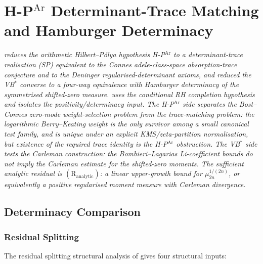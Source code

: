 \chapter{H-P\(^{\mathrm{Ar}}\) Determinant-Trace Matching and Hamburger Determinacy}
\label{v4-arith:hpar-det}

\emph{ reduces the arithmetic
Hilbert--P\'olya hypothesis H-P\(^{\mathrm{Ar}}\) to a determinant-trace
realisation (SP) equivalent to the Connes adele-class-space
absorption-trace conjecture and to the Deninger regularised-determinant
axioms, and reduced the VB\(^{*}\) converse to a four-way equivalence
with Hamburger determinacy of the symmetrised shifted-zero measure.
 uses the conditional
RH completion hypothesis and isolates the positivity/determinacy input.
The H-P\(^{\mathrm{Ar}}\) side separates
the Bost--Connes zero-mode \emph{weight-selection} problem from the
trace-matching problem: the logarithmic Berry--Keating weight is the
only survivor among a small canonical test family, and is unique under
an explicit KMS/zeta-partition normalisation, but existence of the
required trace identity is the H-P\(^{\mathrm{Ar}}\) obstruction.
The VB\(^{*}\) side tests the Carleman construction: the
Bombieri--Lagarias Li-coefficient bounds do not imply the Carleman
estimate for the shifted-zero moments. The sufficient analytic residual is
\((\mathrm{R}_{\mathrm{analytic}})\): a linear upper-growth bound for
\(\mu_{2n}^{1/(2n)}\), or equivalently a positive regularised
moment measure with Carleman divergence.}

\section{Determinacy Comparison}
\label{v4-arith:hpar-det:context}

\subsection{Residual Splitting}
\label{v4-arith:hpar-det:wave2-recap}

The residual splitting structural analysis of
 gives four structural inputs:

